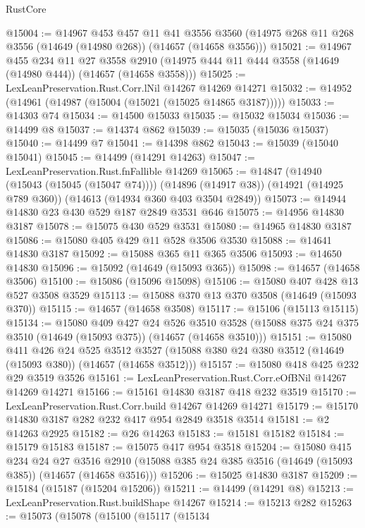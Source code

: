 \begin{lexlean}{RustCore}
\begin{coremodule}
@15004 := @14967
    @453
    @457
    @11
    @41
    @3556
    @3560
    (@14975 @268 @11 @268 @3556 (@14649 (@14980 @268)) (@14657 (@14658 @3556)))
@15021 := @14967
    @455
    @234
    @11
    @27
    @3558
    @2910
    (@14975 @444 @11 @444 @3558 (@14649 (@14980 @444)) (@14657 (@14658 @3558)))
@15025 := LexLeanPreservation.Rust.Corr.lNil @14267 @14269 @14271
@15032 := @14952 (@14961 (@14987 (@15004 (@15021 (@15025 @14865 @3187)))))
@15033 := @14303 @74
@15034 := @14500 @15033
@15035 := @15032 @15034
@15036 := @14499 @8
@15037 := @14374 @862
@15039 := @15035 (@15036 @15037)
@15040 := @14499 @7
@15041 := @14398 @862
@15043 := @15039 (@15040 @15041)
@15045 := @14499 (@14291 @14263)
@15047 := LexLeanPreservation.Rust.fnFallible @14269
@15065 := @14847
    (@14940 (@15043 (@15045 (@15047 @74))))
    (@14896 (@14917 @38))
    (@14921 (@14925 @789 @360))
    (@14613 (@14934 @360 @403 @3504 @2849))
@15073 := @14944 @14830 @23 @430 @529 @187 @2849 @3531 @646
@15075 := @14956 @14830 @3187
@15078 := @15075 @430 @529 @3531
@15080 := @14965 @14830 @3187
@15086 := @15080 @405 @429 @11 @528 @3506 @3530
@15088 := @14641 @14830 @3187
@15092 := @15088 @365 @11 @365 @3506
@15093 := @14650 @14830
@15096 := @15092 (@14649 (@15093 @365))
@15098 := @14657 (@14658 @3506)
@15100 := @15086 (@15096 @15098)
@15106 := @15080 @407 @428 @13 @527 @3508 @3529
@15113 := @15088 @370 @13 @370 @3508 (@14649 (@15093 @370))
@15115 := @14657 (@14658 @3508)
@15117 := @15106 (@15113 @15115)
@15134 := @15080
    @409
    @427
    @24
    @526
    @3510
    @3528
    (@15088 @375 @24 @375 @3510 (@14649 (@15093 @375)) (@14657 (@14658 @3510)))
@15151 := @15080
    @411
    @426
    @24
    @525
    @3512
    @3527
    (@15088 @380 @24 @380 @3512 (@14649 (@15093 @380)) (@14657 (@14658 @3512)))
@15157 := @15080 @418 @425 @232 @29 @3519 @3526
@15161 := LexLeanPreservation.Rust.Corr.eOfBNil @14267 @14269 @14271
@15166 := @15161 @14830 @3187 @418 @232 @3519
@15170 := LexLeanPreservation.Rust.Corr.build @14267 @14269 @14271
@15179 := @15170 @14830 @3187 @282 @232 @417 @954 @2849 @3518 @3514
@15181 := @2 @14263 @2925
@15182 := @26 @14263
@15183 := @15181 @15182
@15184 := @15179 @15183
@15187 := @15075 @417 @954 @3518
@15204 := @15080
    @415
    @234
    @24
    @27
    @3516
    @2910
    (@15088 @385 @24 @385 @3516 (@14649 (@15093 @385)) (@14657 (@14658 @3516)))
@15206 := @15025 @14830 @3187
@15209 := @15184 (@15187 (@15204 @15206))
@15211 := @14499 (@14291 @8)
@15213 := LexLeanPreservation.Rust.buildShape @14267
@15214 := @15213 @282
@15263 := @15073
    (@15078
      (@15100
        (@15117
          (@15134

\end{coremodule}
\end{lexlean}
